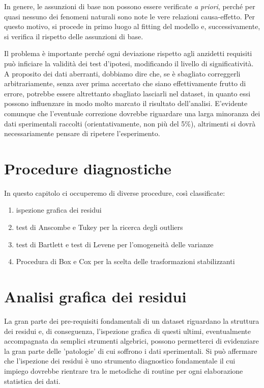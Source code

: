 \documentclass[a4paper,12pt,oneside]{book}
\providecommand{\tightlist}{%
  \setlength{\itemsep}{0pt}\setlength{\parskip}{0pt}}
\theoremstyle{definition}
\theoremstyle{definition}
\theoremstyle{definition}
\theoremstyle{remark}
\begin{document}
In genere, le assunzioni di base non possono essere verificate \emph{a
priori}, perché per quasi nessuno dei fenomeni naturali sono note le
vere relazioni causa-effetto. Per questo motivo, si procede in primo
luogo al fitting del modello e, successivamente, si verifica il rispetto
delle assunzioni di base.

Il problema è importante perché ogni deviazione rispetto agli anzidetti
requisiti può inficiare la validità dei test d'ipotesi, modificando il
livello di significatività. A proposito dei dati aberranti, dobbiamo
dire che, se è sbagliato correggerli arbitrariamente, senza aver prima
accertato che siano effettivamente frutto di errore, potrebbe essere
altrettanto sbagliato lasciarli nel dataset, in quanto essi possono
influenzare in modo molto marcato il risultato dell'analisi. E'evidente
comunque che l'eventuale correzione dovrebbe riguardare una larga
minoranza dei dati sperimentali raccolti (orientativamente, non più del
5\%), altrimenti si dovrà necessariamente pensare di ripetere
l'esperimento.

\section{Procedure diagnostiche}\label{procedure-diagnostiche}

In questo capitolo ci occuperemo di diverse procedure, così
classificate:

\begin{enumerate}
\def\labelenumi{\arabic{enumi}.}
\tightlist
\item
  ispezione grafica dei residui
\item
  test di Anscombe e Tukey per la ricerca degli outliers
\item
  test di Bartlett e test di Levene per l'omogeneità delle varianze
\item
  Procedura di Box e Cox per la scelta delle trasformazioni
  stabilizzanti
\end{enumerate}

\section{Analisi grafica dei residui}\label{analisi-grafica-dei-residui}

La gran parte dei pre-requisiti fondamentali di un dataset riguardano la
struttura dei residui e, di conseguenza, l'ispezione grafica di questi
ultimi, eventualmente accompagnata da semplici strumenti algebrici,
possono permetterci di evidenziare la gran parte delle 'patologie' di
cui soffrono i dati sperimentali. Si può affermare che l'ispezione dei
residui è uno strumento diagnostico fondamentale il cui impiego dovrebbe
rientrare tra le metodiche di routine per ogni elaborazione statistica
dei dati.
\end{document}
